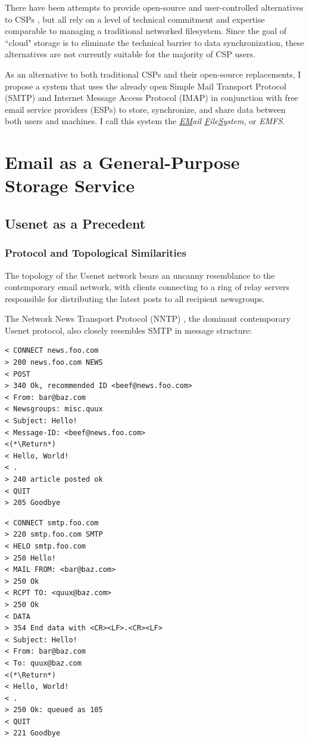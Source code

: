 \documentclass[12pt]{article}
\begin{document}
There have been attempts to provide open-source and user-controlled alternatives
to CSPs \cite{Syncthing, ownCloud}, but all rely on a level of technical
commitment and expertise comparable to managing a traditional networked
filesystem. Since the goal of ``cloud" storage is to eliminate the technical
barrier to data synchronization, these alternatives are not currently suitable
for the majority of CSP users.

As an alternative to both traditional CSPs and their open-source replacements,
I propose a system that uses the already open Simple Mail Transport Protocol
(SMTP) \cite{rfc821} and Internet Message Access Protocol (IMAP) \cite{rfc3501}
in conjunction with free email service providers (ESPs) to store, synchronize,
and share data between both users and machines. I call this system the
\textit{\underline{EM}ail \underline{F}ile\underline{S}ystem}, or \textit{EMFS}.

\section{Email as a General-Purpose Storage Service}

\subsection{Usenet as a Precedent}

\subsubsection{Protocol and Topological Similarities}
The topology of the Usenet network bears an uncanny resemblance to the
contemporary email network, with clients connecting to a ring of relay servers
responsible for distributing the latest posts to all recipient newsgroups.

The Network News Transport Protocol (NNTP) \cite{rfc977, rfc3977}, the dominant
contemporary Usenet protocol, also closely resembles SMTP in
message structure:

\noindent\begin{minipage}{.49\textwidth}
\begin{lstlisting}[caption=NNTP session]
< CONNECT news.foo.com
> 200 news.foo.com NEWS
< POST
> 340 Ok, recommended ID <beef@news.foo.com>
< From: bar@baz.com
< Newsgroups: misc.quux
< Subject: Hello!
< Message-ID: <beef@news.foo.com>
<(*\Return*)
< Hello, World!
< .
> 240 article posted ok
< QUIT
> 205 Goodbye
\end{lstlisting}
\end{minipage}\hfill
\begin{minipage}{.49\textwidth}
\begin{lstlisting}[caption=SMTP session]
< CONNECT smtp.foo.com
> 220 smtp.foo.com SMTP
< HELO smtp.foo.com
> 250 Hello!
< MAIL FROM: <bar@baz.com>
> 250 Ok
< RCPT TO: <quux@baz.com>
> 250 Ok
< DATA
> 354 End data with <CR><LF>.<CR><LF>
< Subject: Hello!
< From: bar@baz.com
< To: quux@baz.com
<(*\Return*)
< Hello, World!
< .
> 250 Ok: queued as 105
< QUIT
> 221 Goodbye
\end{lstlisting}
\end{minipage}\hfill
\end{document}
